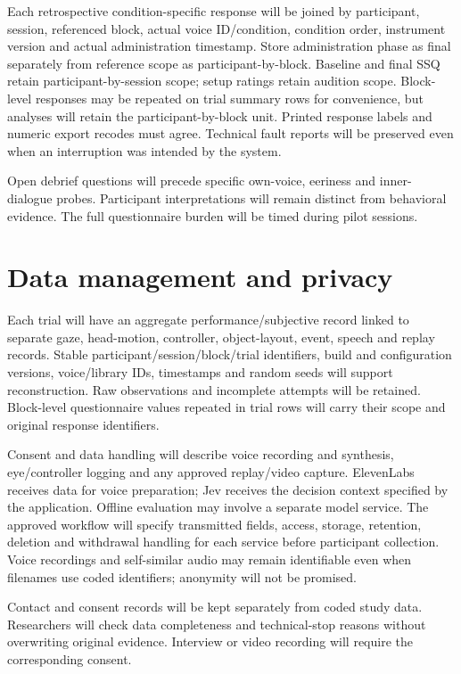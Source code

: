 \documentclass[11pt,letterpaper]{article}
\begin{document}
Each retrospective condition-specific response will be joined by participant, session, referenced block, actual voice ID/condition, condition order, instrument version and actual administration timestamp. Store administration phase as final separately from reference scope as participant-by-block. Baseline and final SSQ retain participant-by-session scope; setup ratings retain audition scope. Block-level responses may be repeated on trial summary rows for convenience, but analyses will retain the participant-by-block unit. Printed response labels and numeric export recodes must agree. Technical fault reports will be preserved even when an interruption was intended by the system.

Open debrief questions will precede specific own-voice, eeriness and inner-dialogue probes. Participant interpretations will remain distinct from behavioral evidence. The full questionnaire burden will be timed during pilot sessions.

\section{Data management and privacy}
Each trial will have an aggregate performance/subjective record linked to separate gaze, head-motion, controller, object-layout, event, speech and replay records. Stable participant/session/block/trial identifiers, build and configuration versions, voice/library IDs, timestamps and random seeds will support reconstruction. Raw observations and incomplete attempts will be retained. Block-level questionnaire values repeated in trial rows will carry their scope and original response identifiers.

Consent and data handling will describe voice recording and synthesis, eye/controller logging and any approved replay/video capture. ElevenLabs receives data for voice preparation; Jev receives the decision context specified by the application. Offline evaluation may involve a separate model service. The approved workflow will specify transmitted fields, access, storage, retention, deletion and withdrawal handling for each service before participant collection. Voice recordings and self-similar audio may remain identifiable even when filenames use coded identifiers; anonymity will not be promised.

Contact and consent records will be kept separately from coded study data. Researchers will check data completeness and technical-stop reasons without overwriting original evidence. Interview or video recording will require the corresponding consent.


\end{document}
